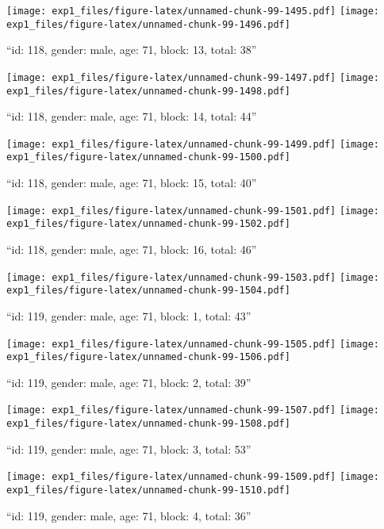 \documentclass[,]{article}
\begin{document}
\texttt{[image: exp1\_files/figure-latex/unnamed-chunk-99-1495.pdf]}
\texttt{[image: exp1\_files/figure-latex/unnamed-chunk-99-1496.pdf]}

\newpage
[1] 

``id: 118, gender: male, age: 71, block: 13, total: 38''

\texttt{[image: exp1\_files/figure-latex/unnamed-chunk-99-1497.pdf]}
\texttt{[image: exp1\_files/figure-latex/unnamed-chunk-99-1498.pdf]}

\newpage
[1] 

``id: 118, gender: male, age: 71, block: 14, total: 44''

\texttt{[image: exp1\_files/figure-latex/unnamed-chunk-99-1499.pdf]}
\texttt{[image: exp1\_files/figure-latex/unnamed-chunk-99-1500.pdf]}

\newpage
[1] 

``id: 118, gender: male, age: 71, block: 15, total: 40''

\texttt{[image: exp1\_files/figure-latex/unnamed-chunk-99-1501.pdf]}
\texttt{[image: exp1\_files/figure-latex/unnamed-chunk-99-1502.pdf]}

\newpage
[1] 

``id: 118, gender: male, age: 71, block: 16, total: 46''

\texttt{[image: exp1\_files/figure-latex/unnamed-chunk-99-1503.pdf]}
\texttt{[image: exp1\_files/figure-latex/unnamed-chunk-99-1504.pdf]}

\newpage
[1] 

``id: 119, gender: male, age: 71, block: 1, total: 43''

\texttt{[image: exp1\_files/figure-latex/unnamed-chunk-99-1505.pdf]}
\texttt{[image: exp1\_files/figure-latex/unnamed-chunk-99-1506.pdf]}

\newpage
[1] 

``id: 119, gender: male, age: 71, block: 2, total: 39''

\texttt{[image: exp1\_files/figure-latex/unnamed-chunk-99-1507.pdf]}
\texttt{[image: exp1\_files/figure-latex/unnamed-chunk-99-1508.pdf]}

\newpage
[1] 

``id: 119, gender: male, age: 71, block: 3, total: 53''

\texttt{[image: exp1\_files/figure-latex/unnamed-chunk-99-1509.pdf]}
\texttt{[image: exp1\_files/figure-latex/unnamed-chunk-99-1510.pdf]}

\newpage
[1] 

``id: 119, gender: male, age: 71, block: 4, total: 36''
\end{document}

